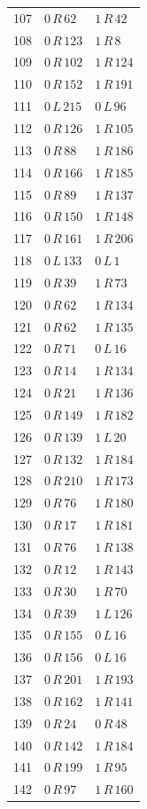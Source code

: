 \begin{longtable}{rll}
107 & $0\,R\,62$ & $1\,R\,42$ \\
108 & $0\,R\,123$ & $1\,R\,8$ \\
109 & $0\,R\,102$ & $1\,R\,124$ \\
110 & $0\,R\,152$ & $1\,R\,191$ \\
111 & $0\,L\,215$ & $0\,L\,96$ \\
112 & $0\,R\,126$ & $1\,R\,105$ \\
113 & $0\,R\,88$ & $1\,R\,186$ \\
114 & $0\,R\,166$ & $1\,R\,185$ \\
115 & $0\,R\,89$ & $1\,R\,137$ \\
116 & $0\,R\,150$ & $1\,R\,148$ \\
117 & $0\,R\,161$ & $1\,R\,206$ \\
118 & $0\,L\,133$ & $0\,L\,1$ \\
119 & $0\,R\,39$ & $1\,R\,73$ \\
120 & $0\,R\,62$ & $1\,R\,134$ \\
121 & $0\,R\,62$ & $1\,R\,135$ \\
122 & $0\,R\,71$ & $0\,L\,16$ \\
123 & $0\,R\,14$ & $1\,R\,134$ \\
124 & $0\,R\,21$ & $1\,R\,136$ \\
125 & $0\,R\,149$ & $1\,R\,182$ \\
126 & $0\,R\,139$ & $1\,L\,20$ \\
127 & $0\,R\,132$ & $1\,R\,184$ \\
128 & $0\,R\,210$ & $1\,R\,173$ \\
129 & $0\,R\,76$ & $1\,R\,180$ \\
130 & $0\,R\,17$ & $1\,R\,181$ \\
131 & $0\,R\,76$ & $1\,R\,138$ \\
132 & $0\,R\,12$ & $1\,R\,143$ \\
133 & $0\,R\,30$ & $1\,R\,70$ \\
134 & $0\,R\,39$ & $1\,L\,126$ \\
135 & $0\,R\,155$ & $0\,L\,16$ \\
136 & $0\,R\,156$ & $0\,L\,16$ \\
137 & $0\,R\,201$ & $1\,R\,193$ \\
138 & $0\,R\,162$ & $1\,R\,141$ \\
139 & $0\,R\,24$ & $0\,R\,48$ \\
140 & $0\,R\,142$ & $1\,R\,184$ \\
141 & $0\,R\,199$ & $1\,R\,95$ \\
142 & $0\,R\,97$ & $1\,R\,160$ \\

\end{longtable}
